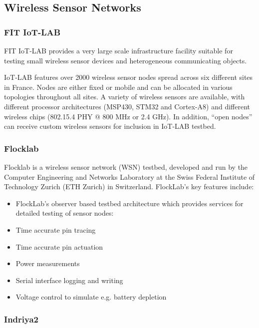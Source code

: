 \documentclass[]{article}
\begin{document}
\subsection{Wireless Sensor Networks}

\subsubsection{FIT IoT-LAB}
FIT IoT-LAB \cite{FIT-IoT} provides a very large scale infrastructure facility suitable for testing small wireless sensor devices and heterogeneous communicating objects.

IoT-LAB features over 2000 wireless sensor nodes spread across six different sites in France.  Nodes are either fixed or mobile and can be allocated in various topologies throughout all sites.  A variety of wireless sensors are available, with different processor architectures (MSP430, STM32 and Cortex-A8) and different wireless chips (802.15.4 PHY @ 800 MHz or 2.4 GHz).  In addition, “open nodes” can receive custom wireless sensors for inclusion in IoT-LAB testbed.

\subsubsection{Flocklab}

Flocklab \cite{flocklab} is a wireless sensor network (WSN) testbed, developed and run by the ​Computer Engineering and Networks Laboratory at the ​Swiss Federal Institute of Technology Zurich (ETH Zurich) in Switzerland. FlockLab's key features include:
\begin{itemize}
	\item FlockLab's observer based testbed architecture which provides services for detailed testing of sensor nodes:
	\item Time accurate pin tracing
	\item Time accurate pin actuation
	\item Power measurements
	\item Serial interface logging and writing
	\item Voltage control to simulate e.g. battery depletion
\end{itemize}

\subsubsection{Indriya2}
\end{document}

